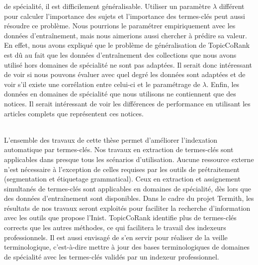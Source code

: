     de spécialité, il est difficilement généralisable. Utiliser un paramètre
    $\lambda$ différent pour calculer l'importance des sujets et l'importance
    des termes-clés peut aussi résoudre ce problème. Nous pourrions le
    paramétrer empiriquement avec les données d'entraînement, mais nous
    aimerions aussi chercher à prédire sa valeur. En effet, nous avons expliqué
    que le problème de généralisation de TopicCoRank est dû au fait que les
    données d'entraînement des collections que nous avons utilisé hors domaines
    de spécialité ne sont pas adaptées. Il serait donc intéressant de voir si
    nous pouvons évaluer avec quel degré les données sont adaptées et de voir
    s'il existe une corrélation entre celui-ci et le paramétrage de $\lambda$.
    Enfin, les données en domaines de spécialité que nous utilisons ne
    contiennent que des notices. Il serait intéressant de voir les différences
    de performance en utilisant les articles complets que représentent ces notices.

    ~\\L'ensemble des travaux de cette thèse permet d'améliorer l'indexation
    automatique par termes-clés. Nos travaux en extraction de termes-clés sont
    applicables dans presque tous les scénarios d'utilisation. Aucune ressource
    externe n'est nécessaire à l'exception de celles requises par les outils de
    prétraitement (segmentation et étiquetage grammatical). Ceux en
    extraction et assignement simultanés de termes-clés sont applicables en
    domaines de spécialité, dès lors que des données d'entraînement sont
    disponibles. Dans le cadre du projet Termith, les résultats de nos travaux
    seront exploités pour faciliter la recherche d'information avec les outils
    que propose l'Inist. TopicCoRank identifie plus de termes-clés corrects que
    les autres méthodes, ce qui facilitera le travail des indexeurs
    professionnels.
    Il est aussi envisagé de s'en servir pour réaliser de
    la veille terminologique, c'est-à-dire mettre à jour des bases
    terminologiques de domaines de spécialité avec les termes-clés validés par
    un indexeur professionnel.

